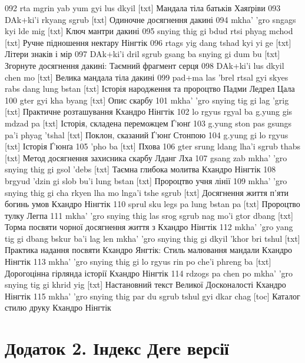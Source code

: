 \documentclass{article}
\begin{document}
092 rta mgrin yab yum gyi lus dkyil [txt] Мандала тіла батьків Хаяґріви
093 DAk+ki'i rkyang sgrub [txt] Одиночне досягнення дакині
094 mkha' 'gro sngags kyi lde mig [txt] Ключ мантри дакині
095 snying thig gi bdud rtsi phyag mchod [txt] Ручне підношення нектару Нінгтік
096 rtags yig dang tshad kyi yi ge [txt] Літери знаків і мір
097 DAk+ki'i dril sgrub gsang ba snying gi dum bu [txt] Згорнуте досягнення дакині: Таємний фрагмент серця
098 DAk+ki'i lus dkyil chen mo [txt] Велика мандала тіла дакині
099 pad+ma las 'brel rtsal gyi skyes rabs dang lung bstan [txt] Історія народження та пророцтво Падми Ледрел Цала
100 gter gyi kha byang [txt] Опис скарбу
101 mkha' 'gro snying tig gi lag 'grig [txt] Практичне розташування Кхандро Нінгтік
102 lo rgyus rgyal ba g.yung gis mdzad pa [txt] Історія, складена переможцем Ґ'юнґ
103 g.yung ston pas gsungs pa'i phyag 'tshal [txt] Поклон, сказаний Ґ'юнґ Стонпою
104 g.yung gi lo rgyus [txt] Історія Ґ'юнґа
105 'pho ba [txt] Пхова
106 gter srung ldang lha'i sgrub thabs [txt] Метод досягнення захисника скарбу Лданг Лха
107 gsang zab mkha' 'gro snying thig gi gsol 'debs [txt] Таємна глибока молитва Кхандро Нінгтік
108 brgyud 'dzin gi slob bu'i lung bstan [txt] Пророцтво учня лінії
109 mkha' 'gro snying thig gi cha rkyen lha mo lnga'i tshe sgrub [txt] Досягнення життя п'яти богинь умов Кхандро Нінгтік
110 sprul sku legs pa lung bstan pa [txt] Пророцтво тулку Легпа
111 mkha' 'gro snying thig las srog sgrub nag mo'i gtor dbang [txt] Торма посвяти чорної досягнення життя з Кхандро Нінгтік
112 mkha' 'gro yang tig gi dbang bskur ba'i lag len mkha' 'gro snying thig gi dkyil 'khor bri tshul [txt] Практика надання посвяти Кхандро Янгтік: Стиль малювання мандали Кхандро Нінгтік
113 mkha' 'gro snying thig gi lo rgyus rin po che'i phreng ba [txt] Дорогоцінна гірлянда історії Кхандро Нінгтік
114 rdzogs pa chen po mkha' 'gro snying tig gi khrid yig [txt] Настановний текст Великої Досконалості Кхандро Нінгтік
115 mkha' 'gro snying thig par du sgrub tshul gyi dkar chag [toc] Каталог стилю друку Кхандро Нінгтік

\newpage
\section{Додаток 2. Індекс Деге версії}
\end{document}
